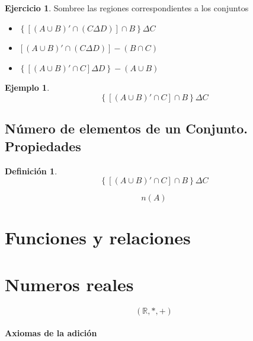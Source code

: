\documentclass[
  16pt,
]{krantz}
\theoremstyle{definition}
\newtheorem{definition}{Definición}[chapter]
\theoremstyle{definition}
\newtheorem{example}{Ejemplo}[chapter]
\theoremstyle{definition}
\newtheorem{exercise}{Ejercicio}[chapter]
\theoremstyle{definition}
\theoremstyle{remark}
\begin{document}
\begin{exercise}

Sombree las regiones correspondientes a los conjuntos

\begin{itemize}
\item
  \(\left\{ \left[ \left( A\cup B \right)'\cap \left( C \Delta D \right) \right] \cap B \right\} \Delta C\)
\item
  \(\left[ \left( A\cup B \right)'\cap \left( C \Delta D \right) \right]-\left( B\cap C \right)\)
\item
  \(\left\{ \left[ \left( A\cup B \right)'\cap C \right] \Delta D \right\} -\left( A\cup B \right)\)\\
\end{itemize}

\end{exercise}

\begin{example}
\[ \left\{  \left[ \left( A\cup B \right)'\cap  C \right] \cap B \right\} \Delta C \]
\end{example}

\hypertarget{nuxfamero-de-elementos-de-un-conjunto.-propiedades}{%
\section{Número de elementos de un Conjunto. Propiedades}\label{nuxfamero-de-elementos-de-un-conjunto.-propiedades}}

\begin{definition}
\[ \left\{  \left[ \left( A\cup B \right)'\cap  C \right] \cap B \right\} \Delta C \]
\end{definition}

\[
n(A)
\]

\hypertarget{funciones-y-relaciones}{%
\chapter{Funciones y relaciones}\label{funciones-y-relaciones}}

\hypertarget{numeros-reales}{%
\chapter{Numeros reales}\label{numeros-reales}}

\[(\mathbb{R}, *, +)\]

\hypertarget{axiomas-de-la-adiciuxf3n}{%
\subsubsection{Axiomas de la adición}\label{axiomas-de-la-adiciuxf3n}}
\end{document}

